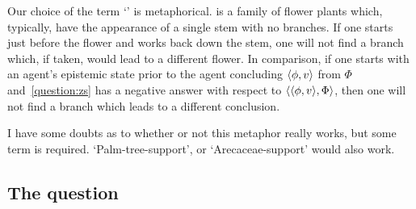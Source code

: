 \begin{note}
  Our choice of the term `' is metaphorical.
   is a family of flower plants which, typically, have the appearance of a single stem with no branches.
  If one starts just before the flower and works back down the stem, one will not find a branch which, if taken, would lead to a different flower.
  In comparison, if one starts with an agent's epistemic state prior to the agent concluding \(\langle \phi, v \rangle\) from \(\Phi\) and~\autoref{question:zs} has a negative answer with respect to \(\langle \langle \phi, v \rangle, \Phi \rangle\), then one will not find a branch which leads to a different conclusion.

  I have some doubts as to whether or not this metaphor really works, but some term is required.
  `Palm-tree-support', or `Arecaceae-support' would also work.
\end{note}

\subsection{The question}
\label{sec:ZS:question}

